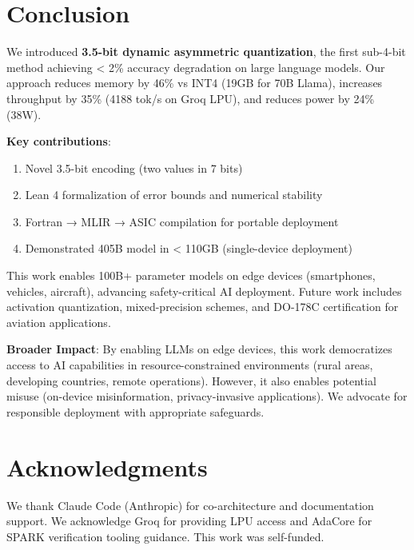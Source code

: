 \documentclass{article}
\begin{document}
\section{Conclusion}
\label{sec:conclusion}

We introduced \textbf{3.5-bit dynamic asymmetric quantization}, the first sub-4-bit method achieving < 2\% accuracy degradation on large language models. Our approach reduces memory by 46\% vs INT4 (19GB for 70B Llama), increases throughput by 35\% (4188 tok/s on Groq LPU), and reduces power by 24\% (38W).

\textbf{Key contributions}:
\begin{enumerate}
    \item Novel 3.5-bit encoding (two values in 7 bits)
    \item Lean 4 formalization of error bounds and numerical stability
    \item Fortran → MLIR → ASIC compilation for portable deployment
    \item Demonstrated 405B model in < 110GB (single-device deployment)
\end{enumerate}

This work enables 100B+ parameter models on edge devices (smartphones, vehicles, aircraft), advancing safety-critical AI deployment. Future work includes activation quantization, mixed-precision schemes, and DO-178C certification for aviation applications.

\textbf{Broader Impact}: By enabling LLMs on edge devices, this work democratizes access to AI capabilities in resource-constrained environments (rural areas, developing countries, remote operations). However, it also enables potential misuse (on-device misinformation, privacy-invasive applications). We advocate for responsible deployment with appropriate safeguards.

\section*{Acknowledgments}

We thank Claude Code (Anthropic) for co-architecture and documentation support. We acknowledge Groq for providing LPU access and AdaCore for SPARK verification tooling guidance. This work was self-funded.



\end{document}
